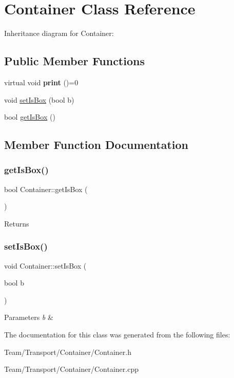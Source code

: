 \hypertarget{classContainer}{}\section{Container Class Reference}
\label{classContainer}


Inheritance diagram for Container\+:
\subsection*{Public Member Functions}
\begin{DoxyCompactItemize}
\item 
\mbox{\label{classContainer_a0056752dea3f0d49dc085b0284d86ec5}} 
virtual void {\bfseries print} ()=0
\item 
void \hyperlink{classContainer_a9bba4330d6f63a7696f6932819177cac}{set\+Is\+Box} (bool b)
\item 
bool \hyperlink{classContainer_a6b312784119e05843e1b4c4393054d77}{get\+Is\+Box} ()
\end{DoxyCompactItemize}


\subsection{Member Function Documentation}
\mbox{\label{classContainer_a6b312784119e05843e1b4c4393054d77}} 
\subsubsection{\texorpdfstring{get\+Is\+Box()}{getIsBox()}}
{\footnotesize\ttfamily bool Container\+::get\+Is\+Box (\begin{DoxyParamCaption}{ }\end{DoxyParamCaption})}

\begin{DoxyReturn}{Returns}

\end{DoxyReturn}
\mbox{\label{classContainer_a9bba4330d6f63a7696f6932819177cac}} 
\subsubsection{\texorpdfstring{set\+Is\+Box()}{setIsBox()}}
{\footnotesize\ttfamily void Container\+::set\+Is\+Box (\begin{DoxyParamCaption}\item[{bool}]{b }\end{DoxyParamCaption})}


\begin{DoxyParams}{Parameters}
{\em b} & \\
\hline
\end{DoxyParams}


The documentation for this class was generated from the following files\+:\begin{DoxyCompactItemize}
\item 
Team/\+Transport/\+Container/Container.\+h\item 
Team/\+Transport/\+Container/Container.\+cpp\end{DoxyCompactItemize}
